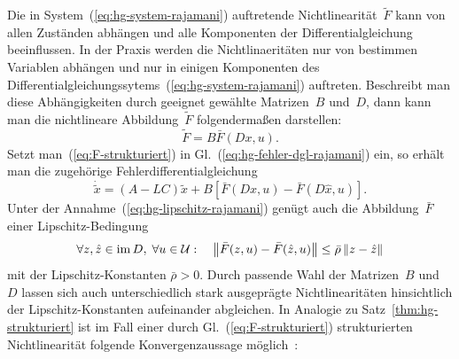 Die in System~(\ref{eq:hg-system-rajamani}) auftretende Nichtlinearität~$\widetilde{F}$
kann von allen Zuständen abhängen und alle Komponenten der Differentialgleichung
beeinflussen. In der Praxis werden die Nichtlinaeritäten nur von bestimmen
Variablen abhängen und nur in einigen Komponenten des Differentialgleichungssytems~(\ref{eq:hg-system-rajamani})
auftreten. Beschreibt man diese Abhängigkeiten durch geeignet gewählte
Matrizen~$B$ und~$D$, dann kann man die nichtlineare Abbildung~$\widetilde{F}$
folgendermaßen darstellen:
\begin{equation}
\widetilde{F}=B\bar{F}(Dx,u).\label{eq:F-strukturiert}
\end{equation}
Setzt man~(\ref{eq:F-strukturiert}) in Gl.~(\ref{eq:hg-fehler-dgl-rajamani})
ein, so erhält man die zugehörige Fehlerdifferentialgleichung
\begin{equation}
\dot{\tilde{x}}=\left(A-LC\right)\tilde{x}+B\left[\bar{F}(Dx,u)-\bar{F}(D\hat{x},u)\right].\label{eq:hg-fehler-dgl-strukturiert}
\end{equation}
Unter der Annahme~(\ref{eq:hg-lipschitz-rajamani}) genügt auch die
Abbildung~$\bar{F}$ einer Lipschitz-Bedingung
\begin{equation}
\forall z,\hat{z}\in{\operatorname{im}}\,D,\;\forall u\in\mathcal{U}:\quad\left\Vert \bar{F}(z,u)-\bar{F}(\hat{z},u)\right\Vert \leq\bar{\rho}\left\Vert z-\hat{z}\right\Vert \label{eq:hg-lipschitz-strukturiert}
\end{equation}
mit der Lipschitz-Konstanten $\bar{\rho}>0$. Durch passende Wahl
der Matrizen~$B$ und~$D$ lassen sich auch unterschiedlich stark
ausgeprägte Nichtlinearitäten hinsichtlich der Lipschitz-Konstanten
aufeinander abgleichen. In Analogie zu Satz~\ref{thm:hg-strukturiert}
ist im Fall einer durch Gl.~(\ref{eq:F-strukturiert}) strukturierten
Nichtlinearität folgende Konvergenzaussage möglich~\cite{roebenack2012ssd,roebenack2014pamm,roebenack2016sac}:
